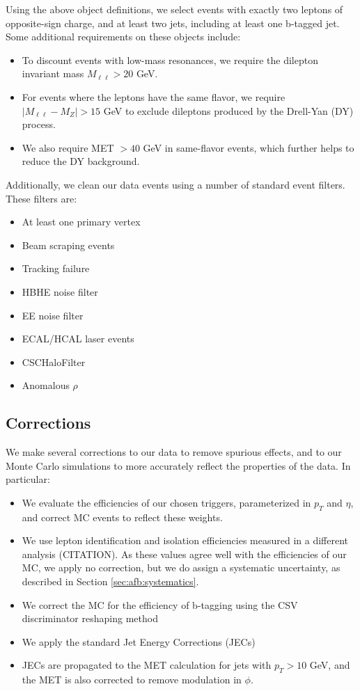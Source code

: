 Using the above object definitions, we select events with exactly
two leptons of opposite-sign charge, and at least two jets, including at
least one b-tagged jet. Some additional requirements on these objects
include:

\begin{itemize}
\item To discount events with low-mass resonances, we require the
  dilepton invariant mass $M_{\ell\ell} > 20$ GeV.
\item For events where the leptons have the same flavor, we require
  $|M_{\ell\ell} - M_Z| > 15$ GeV to exclude dileptons produced by the
  Drell-Yan (DY) process.
\item We also require MET $> 40$ GeV in same-flavor events, which
  further helps to reduce the DY background.
\end{itemize}

Additionally, we clean our data events using a number of standard
event filters. These filters are:

\begin{itemize}
\item At least one primary vertex
\item Beam scraping events
\item Tracking failure
\item HBHE noise filter
\item EE noise filter
\item ECAL/HCAL laser events
\item CSCHaloFilter
\item Anomalous $\rho$
\end{itemize}

\subsection{Corrections}
\label{ssec:afb:evtweights}

We make several corrections to our data to remove spurious effects,
and to our Monte Carlo simulations to more accurately reflect the
properties of the data. In particular:

\begin{itemize}
\item We evaluate the efficiencies of our chosen triggers,
  parameterized in $p_T$ and $\eta$, and correct
  MC events to reflect these weights. %
\item We use lepton identification and isolation efficiencies measured
  in a different analysis (CITATION). As these values agree well with %
  the efficiencies of our MC, we apply no correction, but we do assign
  a systematic uncertainty, as described in Section
  \ref{sec:afb:systematics}.
\item We correct the MC for the efficiency of b-tagging using the CSV
  discriminator reshaping method
\item We apply the standard Jet Energy Corrections (JECs)
\item JECs are propagated to the MET calculation for jets with $p_T >
  10$ GeV, and the MET is also corrected to remove modulation in $\phi$.
\end{itemize}

